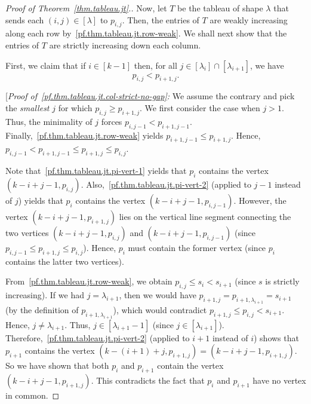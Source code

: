 \documentclass[reqno]{amsart}
\newcommand{\0}{\phantom{c}}
\newcommand{\diag}[1]{\left[#1\right]} %
\newcommand{\tup}[1]{\left( #1 \right)}
\newcommand{\ive}[1]{\left[ #1 \right]}
\theoremstyle{plain}
\theoremstyle{definition}
\numberwithin{equation}{section}
\begin{document}
\begin{proof}[Proof of Theorem~\ref{thm.tableau.jt}.]
Now, let $T$ be the tableau of shape $\lambda$ that sends each $(i,j) \in \diag{\lambda}$  to $p_{i,j}$.
Then, the entries of $T$ are weakly increasing along each row by~\eqref{pf.thm.tableau.jt.row-weak}.
We shall next show that the entries of $T$ are strictly increasing down each column.

First, we claim that if $i \in \ive{k-1}$ then, for all $j \in \ive{\lambda_i} \cap \ive{\lambda_{i+1}}$, we have
\begin{equation}
\label{pf.thm.tableau.jt.col-strict-no-gap}
p_{i,j} < p_{i+1,j}.
\end{equation}

[\textit{Proof of~\eqref{pf.thm.tableau.jt.col-strict-no-gap}:}
We assume the contrary and pick the \emph{smallest} $j$ for which $p_{i,j} \geq p_{i+1,j}$.
We first consider the case when $j > 1$.
Thus, the minimality of $j$ forces $p_{i,j-1} < p_{i+1,j-1}$.
Finally,~\eqref{pf.thm.tableau.jt.row-weak} yields $p_{i+1,j-1}\leq p_{i+1,j}$.
Hence, $p_{i,j-1} < p_{i+1,j-1} \leq p_{i+1,j} \leq p_{i,j}$.

Note that~\eqref{pf.thm.tableau.jt.pi-vert-1} yields that $p_i$ contains the vertex $\tup{k-i+j-1, p_{i,j}}$.
Also,~\eqref{pf.thm.tableau.jt.pi-vert-2} (applied to $j-1$ instead of $j$) yields that $p_i$ contains the vertex $\tup{k-i+j-1, p_{i,j-1}}$.
However, the vertex $\tup{k-i+j-1, p_{i+1,j}}$ lies on the vertical line segment connecting the two vertices $\tup{k-i+j-1, p_{i,j}}$ and $\tup{k-i+j-1,p_{i,j-1}}$ (since $p_{i,j-1} \leq p_{i+1,j} \leq p_{i,j}$).
Hence, $p_i$ must contain the former vertex (since $p_i$ contains the latter two vertices).

From~\eqref{pf.thm.tableau.jt.row-weak}, we obtain $p_{i,j}\leq s_i < s_{i+1}$ (since $s$ is strictly increasing).
If we had $j=\lambda_{i+1}$, then we would have $p_{i+1,j}=p_{i+1,\lambda_{i+1}} = s_{i+1}$ (by the definition of
$p_{i+1,\lambda_{i+1}}$), which would contradict $p_{i+1,j}\leq p_{i,j} < s_{i+1}$.
Hence, $j\neq\lambda_{i+1}$. Thus, $j \in \ive{\lambda_{i+1}-1}$ (since $j \in \ive{\lambda_{i+1}}$).
Therefore,~\eqref{pf.thm.tableau.jt.pi-vert-2} (applied to $i+1$ instead of $i$) shows that $p_{i+1}$ contains the vertex $\tup{k-\left(  i+1\right)+j, p_{i+1,j}} = \tup{k-i+j-1, p_{i+1,j}}$.
So we have shown that both $p_i$ and $p_{i+1}$ contain the vertex $\tup{k-i+j-1, p_{i+1,j}}$.
This contradicts the fact that $p_i$ and $p_{i+1}$ have no vertex in common.


\end{proof}
\end{document}
